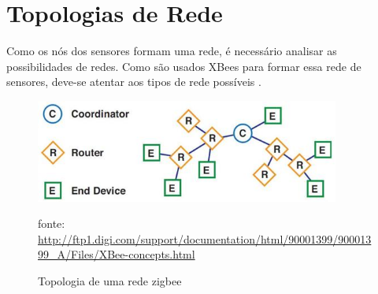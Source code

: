  
\section{Topologias de Rede}
\label{Sec:Redes_topologias}
 Como os nós dos sensores formam uma rede, é necessário analisar as possibilidades de redes.  Como são usados XBees para formar essa rede de sensores, deve-se atentar aos tipos de rede possíveis \citet{xbee_book} \citet{xbee_documentation}.
 
\begin{figure}[H]
\centering
\includegraphics[width=10cm,keepaspectratio]{figuras/zigbee_network_topology.jpg}
\caption{\label{fig:zigbee_network} Topologia de uma rede zigbee}
fonte: \url{http://ftp1.digi.com/support/documentation/html/90001399/90001399_A/Files/XBee-concepts.html}
\end{figure}
 
